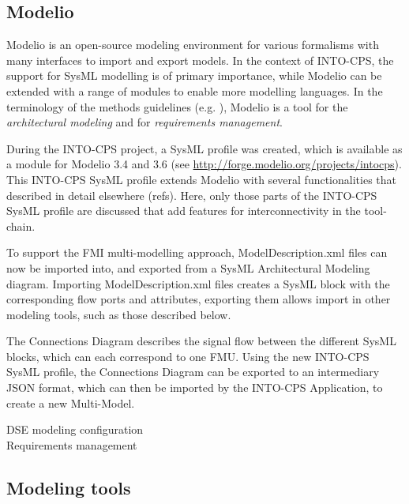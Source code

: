 \subsection{Modelio}

Modelio is an open-source modeling environment for various formalisms with many interfaces to import and export models. In the context of INTO-CPS, the support for SysML modelling is of primary importance, while Modelio can be extended with a range of modules to enable more modelling languages. In the terminology of the methods guidelines (e.g. \cite{INTOCPSD3.3a}), Modelio is a tool for the \textit{architectural modeling} and for \textit{requirements management}.

During the INTO-CPS project, a SysML profile was created, which is available as a module for Modelio 3.4 and 3.6 (see \url{http://forge.modelio.org/projects/intocps}). This INTO-CPS SysML profile extends Modelio with several functionalities that described in detail elsewhere (refs). Here, only those parts of the INTO-CPS SysML profile are discussed that add features for interconnectivity in the tool-chain.

To support the FMI multi-modelling approach, ModelDescription.xml files can now be imported into, and exported from a SysML Architectural Modeling diagram. Importing ModelDescription.xml files creates a SysML block with the corresponding flow ports and attributes, exporting them allows import in other modeling tools, such as those described below.

The Connections Diagram describes the signal flow between the different SysML blocks, which can each correspond to one FMU. Using the new INTO-CPS SysML profile, the Connections Diagram can be exported to an intermediary JSON format, which can then be imported by the INTO-CPS Application, to create a new Multi-Model.

DSE modeling configuration\\
Requirements management\\

\subsection{Modeling tools}

